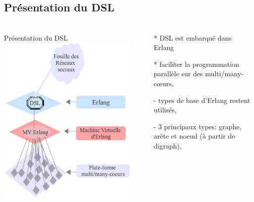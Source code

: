 \documentclass[10pt]{beamer}
\begin{document}
\subsection{Présentation du DSL}
\begin{frame}%
\frametitle{}
\begin{columns}[T]
    \begin{column}{.46\textwidth}
      \begin{block}{Présentation du DSL}
    \includegraphics[scale=0.445]{images/presentationDuDSL.png}
    \end{block}
    \end{column}
    \begin{column}{.48\textwidth}
    \begin{block}{}
      \begin{itemize}
       \item[*] DSL est embarqué dans Erlang
       \item[*] faciliter la programmation parallèle sur des multi/many-c\oe urs,
      \end{itemize}
    \end{block}
    \begin{block}{}
      \begin{itemize}
       \item[-] types de base d'Erlang restent utilisés,
       \item[-] 3 principaux types: graphe, arête et noeud (à partir de digraph),

\end{itemize}
\end{block}
\end{column}
\end{columns}
\end{frame}
\end{document}
